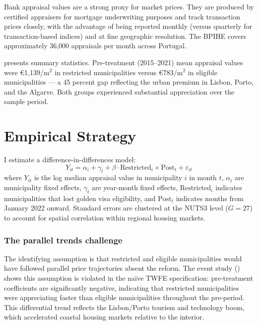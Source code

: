 \documentclass[12pt]{article}
\begin{document}
Bank appraisal values are a strong proxy for market prices. They are produced by certified appraisers for mortgage underwriting purposes and track transaction prices closely, with the advantage of being reported monthly (versus quarterly for transaction-based indices) and at fine geographic resolution. The BPIHE covers approximately 36,000 appraisals per month across Portugal.

 presents summary statistics. Pre-treatment (2015--2021) mean appraisal values were \euro1,139/m$^2$ in restricted municipalities versus \euro783/m$^2$ in eligible municipalities --- a 45 percent gap reflecting the urban premium in Lisbon, Porto, and the Algarve. Both groups experienced substantial appreciation over the sample period.




\section{Empirical Strategy}

I estimate a difference-in-differences model:
\begin{equation}
Y_{it} = \alpha_i + \gamma_t + \beta \cdot \text{Restricted}_i \times \text{Post}_t + \varepsilon_{it}
\label{eq:did}
\end{equation}
where $Y_{it}$ is the log median appraisal value in municipality $i$ in month $t$, $\alpha_i$ are municipality fixed effects, $\gamma_t$ are year-month fixed effects, $\text{Restricted}_i$ indicates municipalities that lost golden visa eligibility, and $\text{Post}_t$ indicates months from January 2022 onward. Standard errors are clustered at the NUTS3 level ($G = 27$) to account for spatial correlation within regional housing markets.

\subsubsection*{The parallel trends challenge} The identifying assumption is that restricted and eligible municipalities would have followed parallel price trajectories absent the reform. The event study () shows this assumption is violated in the na\"{i}ve TWFE specification: pre-treatment coefficients are significantly negative, indicating that restricted municipalities were appreciating faster than eligible municipalities throughout the pre-period. This differential trend reflects the Lisbon/Porto tourism and technology boom, which accelerated coastal housing markets relative to the interior.
\end{document}
